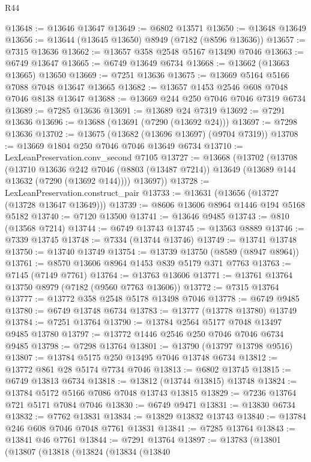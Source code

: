 \begin{lexlean}{R44}
\begin{coremodule}
{@13648 := @13646 @13647
@13649 := @6802 @13571
@13650 := @13648 @13649
@13656 := @13644 (@13645 @13650) @8949 (@7182 (@8596 @13636))
@13657 := @7315 @13636
@13662 := @13657 @358 @2548 @5167 @13490 @7046
@13663 := @6749 @13647
@13665 := @6749 @13649 @6734
@13668 := @13662 (@13663 @13665) @13650
@13669 := @7251 @13636
@13675 := @13669 @5164 @5166 @7088 @7048 @13647 @13665
@13682 := @13657 @1453 @2546 @608 @7048 @7046 @8138 @13647
@13688 := @13669 @244 @250 @7046 @7046 @7319 @6734
@13689 := @7285 @13636
@13691 := @13689 @24 @7319
@13692 := @7291 @13636
@13696 := @13688 (@13691 (@7290 (@13692 @24)))
@13697 := @7298 @13636
@13702 := @13675 (@13682 (@13696 @13697) (@9704 @7319))
@13708 := @13669 @1804 @250 @7046 @7046 @13649 @6734
@13710 := LexLeanPreservation.conv_second @7105
@13727 := @13668
    (@13702
      (@13708
        (@13710
          @13636
          @242
          @7046
          (@8803 (@13487 @7214))
          @13649
          (@13689 @144 @13632 (@7290 (@13692 @144))))
        @13697))
@13728 := LexLeanPreservation.construct_pair
@13733 := @13631 (@13656 (@13727 (@13728 @13647 @13649)))
@13739 := @8606 @13606 @8964 @1446 @194 @5168 @5182
@13740 := @7120 @13500
@13741 := @13646 @9485
@13743 := @810 (@13568 @7214)
@13744 := @6749 @13743
@13745 := @13563 @8889
@13746 := @7339 @13745
@13748 := @7334 (@13744 @13746)
@13749 := @13741 @13748
@13750 := @13740 @13749
@13754 := @13739 @13750 (@8589 (@8947 @8964))
@13761 := @8570 @13606 @8964 @1453 @839 @5179 @371 @7763
@13763 := @7145 (@7149 @7761)
@13764 := @13763 @13606
@13771 := @13761 @13764 @13750 @8979 (@7182 (@9560 @7763 @13606))
@13772 := @7315 @13764
@13777 := @13772 @358 @2548 @5178 @13498 @7046
@13778 := @6749 @9485
@13780 := @6749 @13748 @6734
@13783 := @13777 (@13778 @13780) @13749
@13784 := @7251 @13764
@13790 := @13784 @2564 @5177 @7048 @13497 @9485 @13780
@13797 := @13772 @1446 @2546 @250 @7046 @7046 @6734 @9485
@13798 := @7298 @13764
@13801 := @13790 (@13797 @13798 @9516)
@13807 := @13784 @5175 @250 @13495 @7046 @13748 @6734
@13812 := @13772 @861 @28 @5174 @7734 @7046
@13813 := @6802 @13745
@13815 := @6749 @13813 @6734
@13818 := @13812 (@13744 @13815) @13748
@13824 := @13784 @5172 @5166 @7086 @7048 @13743 @13815
@13829 := @7236 @13764 @721 @5171 @7084 @7046
@13830 := @6749 @9471
@13831 := @13830 @6734
@13832 := @7762 @13831
@13834 := @13829 @13832 @13743
@13840 := @13784 @246 @608 @7046 @7048 @7761 @13831
@13841 := @7285 @13764
@13843 := @13841 @46 @7761
@13844 := @7291 @13764
@13897 := @13783
    (@13801
      (@13807
        (@13818
          (@13824
            (@13834
              (@13840
}
\end{coremodule}
\end{lexlean}
